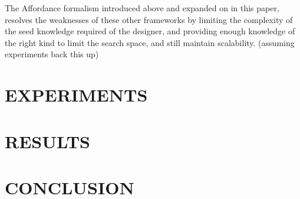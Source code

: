 The Affordance formalism introduced above and expanded on in this paper, resolves the weaknesses of these other frameworks by limiting the complexity of the seed knowledge required of the designer, and providing enough knowledge of the right kind to limit the search space, and still maintain scalability. (assuming experiments back this up)


\section{EXPERIMENTS}

\section{RESULTS}

\section{CONCLUSION}

